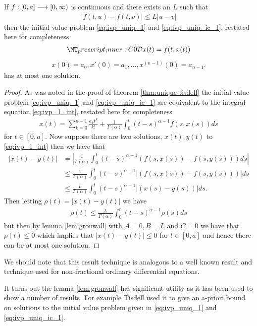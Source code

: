 \begin{mdframed}[innertopmargin=10pt]
\begin{lemma}
	If $ f: [0,a] \longrightarrow [0, \infty) $ is continuous and there exists an $ L $ such that
	\begin{align}
	    |f(t,u) - f(t,v)| \leq L|u-v| 
	\end{align}  
	then the initial value problem \eqref{eq:ivp_uniq_1} and \eqref{eq:ivp_uniq_ic_1}, restated here for completeness
	\begin{align*}   
        \prescript{C}{0}{\mathcal{D}}x(t) = f(t,x(t))
    \end{align*}
    \begin{align*}
        x(0) = a_0, x'(0) = a_1, \ldots, x^{(n-1)}(0) = a_{n-1}.
    \end{align*}
    has at most one solution.
\end{lemma}
\end{mdframed}
\begin{proof}
	As was noted in the proof of theorem \ref{thm:unique-tisdell} the initial value problem \eqref{eq:ivp_uniq_1} and \eqref{eq:ivp_uniq_ic_1} are equivalent to the integral equation \eqref{eq:ivp_1_int}, restated here for completeness
	\begin{align}
		x(t) = \sum_{k=0}^{n-1} \frac{a_k t^k}{k!} + \frac{1}{\Gamma(\alpha)} \int_0^t (t-s)^{\alpha-1}f(s,x(s))ds
	\end{align}
	for $ t \in [0,a] $.
	Now suppose there are two solutions, $ x(t), y(t) $ to \eqref{eq:ivp_1_int} then we have that
	\begin{align*}
		|x(t) - y(t)| &= \left| \frac{1}{\Gamma(\alpha)} \int_0^t (t-s)^{\alpha-1}(f(s,x(s)) - f(s,y(s)))ds \right| \\
			&\leq \frac{1}{\Gamma(\alpha)} \int_0^t (t-s)^{\alpha-1}\left| (f(s,x(s)) - f(s,y(s))) \right|ds \\
			&\leq \frac{L}{\Gamma(\alpha)} \int_0^t (t-s)^{\alpha-1}\left| (x(s) - y(s)) \right|ds.
	\end{align*}
	Then letting $ \rho(t) = |x(t) - y(t)| $
	we have 
	\begin{align*}
		\rho(t) \leq \frac{L}{\Gamma(\alpha)} \int_0^t (t-s)^{\alpha-1}\rho(s)ds
	\end{align*}
	but then by lemma \ref{lem:gronwall} with $ A = 0, B = L $ and $ C = 0 $
	we have that $ \rho(t) \leq 0 $ which implies that $ |x(t) - y(t)| \leq 0 $ for $ t \in [0,a] $ and hence there can be at most one solution.
\end{proof}
	
We should note that this result technique is analogous to a well known result and technique used for non-fractional ordinary differential equations.

It turns out the lemma \ref{lem:gronwall} has significant utility as it has been used to show a number of results. For example Tisdell \cite{Tisdell2012} used it to give an a-priori bound on solutions to the initial value problem given in \eqref{eq:ivp_uniq_1} and \eqref{eq:ivp_uniq_ic_1}.

\clearpage

